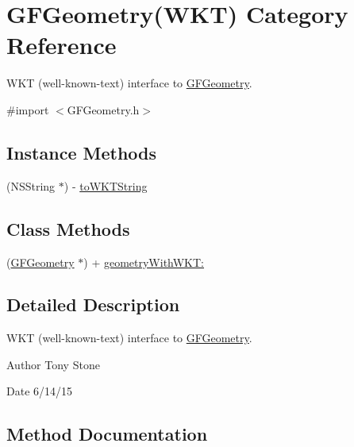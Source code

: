 \hypertarget{category_g_f_geometry_07_w_k_t_08}{}\section{G\+F\+Geometry(W\+K\+T) Category Reference}
\label{category_g_f_geometry_07_w_k_t_08}


W\+K\+T (well-\/known-\/text) interface to \hyperlink{interface_g_f_geometry}{G\+F\+Geometry}.  




{\ttfamily \#import $<$G\+F\+Geometry.\+h$>$}

\subsection*{Instance Methods}
\begin{DoxyCompactItemize}
\item 
(N\+S\+String $\ast$) -\/ \hyperlink{category_g_f_geometry_07_w_k_t_08_a9d257cce05d031211e2cece24b5530e4}{to\+W\+K\+T\+String}
\end{DoxyCompactItemize}
\subsection*{Class Methods}
\begin{DoxyCompactItemize}
\item 
(\hyperlink{interface_g_f_geometry}{G\+F\+Geometry} $\ast$) + \hyperlink{category_g_f_geometry_07_w_k_t_08_a26ad5ae365b4dd4847fdb3370dfb6bb2}{geometry\+With\+W\+K\+T\+:}
\end{DoxyCompactItemize}


\subsection{Detailed Description}
W\+K\+T (well-\/known-\/text) interface to \hyperlink{interface_g_f_geometry}{G\+F\+Geometry}. 

\begin{DoxyAuthor}{Author}
Tony Stone 
\end{DoxyAuthor}
\begin{DoxyDate}{Date}
6/14/15 
\end{DoxyDate}


\subsection{Method Documentation}
\hypertarget{category_g_f_geometry_07_w_k_t_08_a26ad5ae365b4dd4847fdb3370dfb6bb2}{}
